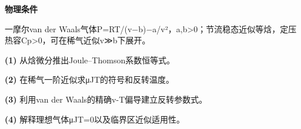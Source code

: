 \textbf{物理条件}\par 一摩尔van der Waals气体P=RT/(v−b)−a/v²，a,b>0；节流稳态近似等焓，定压热容Cp>0，可在稀气近似v≫b下展开。
\par\noindent\textbf{(1)} 从焓微分推出Joule–Thomson系数恒等式。
\par\noindent\textbf{(2)} 在稀气一阶近似求μJT的符号和反转温度。
\par\noindent\textbf{(3)} 利用van der Waals的精确v-T偏导建立反转参数式。
\par\noindent\textbf{(4)} 解释理想气体μJT=0以及临界区近似适用性。
